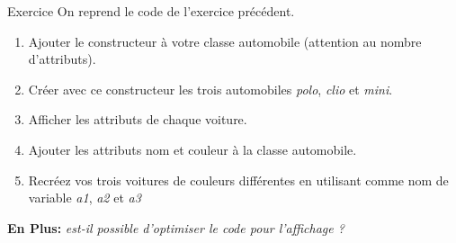 \documentclass[11pt]{article}
\providecommand{\tightlist}{%
      \setlength{\itemsep}{0pt}\setlength{\parskip}{0pt}}
\begin{document}


\begin{exemple}{Exercice}
On reprend le code de l'exercice précédent.

\begin{enumerate}
\def\labelenumi{\arabic{enumi}.}
\tightlist
\item
  Ajouter le constructeur à votre classe automobile (attention au nombre
  d'attributs).
\item
  Créer avec ce constructeur les trois automobiles \emph{polo},
  \emph{clio} et \emph{mini}.
\item
  Afficher les attributs de chaque voiture.
\item
  Ajouter les attributs nom et couleur à la classe automobile.
\item
  Recréez vos trois voitures de couleurs différentes en utilisant comme
  nom de variable \emph{a1}, \emph{a2} et \emph{a3}
\end{enumerate}

\textbf{En Plus:} \emph{est-il possible d'optimiser le code pour
l'affichage ?}
\end{exemple}
    
    
    
\end{document}
